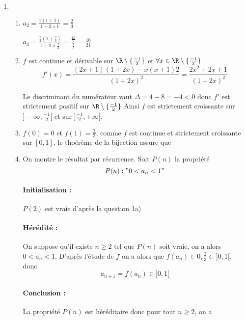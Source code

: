 \documentclass[a4paper, 11pt,reqno]{article}
\begin{document}
\begin{correction}
\begin{enumerate}
\item \begin{enumerate}
\item $a_2 = \frac{1(1+1)}{1+2\times1}= \frac{2}{3}$

 $a_3 =  \frac{ \frac{2}{3}(1+ \frac{2}{3})}{1+2\times \frac{2}{3}}= \frac{ \frac{10}{9}}{\frac{7}{3}} = \frac{10}{21}$
 
 
\item $f$ est continue et dérivable sur $\R\setminus \{ \frac{-1}{2}\}$ et $\forall x\in  \R\setminus \{ \frac{-1}{2}\}$ 
$$ f'(x) = \frac{(2x+1)(1+2x) -x(x+1)2  }{(1+2x)^2 } = \frac{2x^2 +2x +1}{(1+2x)^2}$$

Le discriminant du numérateur vaut $\Delta = 4 - 8=-4<0$ donc $f'$ est strictement positif sur $\R\setminus \{ \frac{-1}{2}\}$
Ainsi $f$ est strictement croissante sur $]-\infty, \frac{-1}{2}[$ et sur $]\frac{-1}{2},+\infty[$.

\item  $f(0)=0$ et $f(1)=\frac{2}{3}$, comme $f$ est continue et strictement croissante sur $[0,1]$, le thoérème de la bijection assure que 
\conclusion{$f(]0,1[) = ]0,\frac{2}{3}[$}

\item On montre le résultat par récurrence. Soit $P(n)$ la propriété 
$$P(n): " 0<a_n<1"$$

\paragraph{Initialisation : }
$P(2)$ est vraie d'après la question 1a)

\paragraph{Hérédité : }
On suppose qu'il existe $n\geq 2$ tel que $P(n)$ soit vraie, on a alors $0<a_n <1$. D'après l'étude de $f$ on a alors que $f(a_n) \in 0,\frac{2}{3}
\subset ]0,1[$, donc 
$$a_{n+1} =f(a_n) \in ]0,1[$$

\paragraph{Conclusion : }
La propriété $P(n)$ est héréditaire donc pour tout $n\geq 2$, on  a 




\end{enumerate}
\end{enumerate}
\end{correction}
\end{document}
